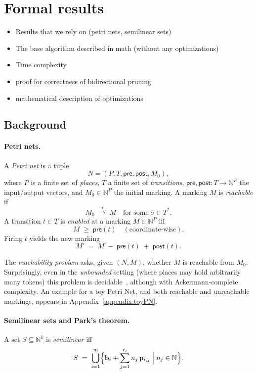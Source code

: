 \section{Formal results}
\label{sec:formal-results}

\begin{itemize}
	\item Results that we rely on (petri nets, semilinear sets)
	\item The base algorithm described in math (without any optimizations)
	\item Time complexity
	\item proof for correctness of bidirectional pruning
	\item mathematical description of optimizations
\end{itemize}


\subsection{Background}

\paragraph{Petri nets.}
A \emph{Petri net} is a tuple
\[
N = (P, T, \mathsf{pre}, \mathsf{post}, M_0),
\]
where \(P\) is a finite set of \emph{places}, \(T\) a finite set of \emph{transitions},
\(\mathsf{pre},\mathsf{post}:T\to\mathbb N^P\) the input/output vectors, and
\(M_0\in\mathbb N^P\) the initial marking.  A marking \(M\) is \emph{reachable} if
\[
M_0 \;\xrightarrow{\sigma}\; M
\quad\text{for some}\;\sigma\in T^*.
\]
%
A transition \(t\in T\) is \emph{enabled} at a marking \(M\in\mathbb N^P\) iff
\[
M \;\ge\; \mathsf{pre}(t)
\quad(\text{coordinate‐wise}).
\]
Firing \(t\) yields the new marking
\[
M' \;=\; M \;-\;\mathsf{pre}(t)\;+\;\mathsf{post}(t).
\]

%
The \emph{reachability problem} asks, given $(N,M)$, whether $M$ is reachable from $M_0$.  Surprisingly, even in the
\emph{unbounded} setting (where places may hold arbitrarily many tokens) this problem is
decidable~\cite{Ma81,Ko82,La92}, although with
Ackermann-complete~\cite{CzWo22} complexity.
%
An example for a toy Petri Net, and both reachable and unreachable markings, appears in Appendix~\ref{appendix:toyPN}.

\paragraph{Semilinear sets and Park’s theorem.}
A set \(S\subseteq\mathbb N^k\) is \emph{semilinear} iff
\[
S \;=\; \bigcup_{i=1}^m \Bigl\{\mathbf b_i + \sum_{j=1}^{r_i} n_j\,\mathbf p_{i,j}
\;\Big|\; n_j\in\mathbb N\Bigr\}.
\]

